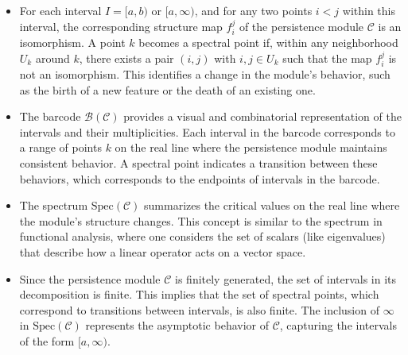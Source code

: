 \begin{remark}\noindent
\begin{itemize}
    \item For each interval $I = [a,b)$ or $[a,\infty)$, and for any two points $i < j$ within this interval, the corresponding structure map $f_{i}^j$ of the persistence module $\mathcal{C}$ is an isomorphism. A point $k$ becomes a spectral point if, within any neighborhood $U_k$ around $k$, there exists a pair $(i, j)$ with $i,j \in U_k$ such that the map $f_{i}^j$ is not an isomorphism. This identifies a change in the module's behavior, such as the birth of a new feature or the death of an existing one.
    \item The barcode $\mathcal{B}(\mathcal{C})$ provides a visual and combinatorial representation of the intervals and their multiplicities. Each interval in the barcode corresponds to a range of points $k$ on the real line where the persistence module maintains consistent behavior. A spectral point indicates a transition between these behaviors, which corresponds to the endpoints of intervals in the barcode.
    \item The spectrum $\text{Spec}(\mathcal{C})$ summarizes the critical values on the real line where the module's structure changes. This concept is similar to the spectrum in functional analysis, where one considers the set of scalars (like eigenvalues) that describe how a linear operator acts on a vector space.
    \item Since the persistence module $\mathcal{C}$ is finitely generated, the set of intervals in its decomposition is finite. This implies that the set of spectral points, which correspond to transitions between intervals, is also finite. The inclusion of $\infty$ in $\text{Spec}(\mathcal{C})$ represents the asymptotic behavior of $\mathcal{C}$, capturing the intervals of the form $[a, \infty)$.
\end{itemize}
\end{remark}

